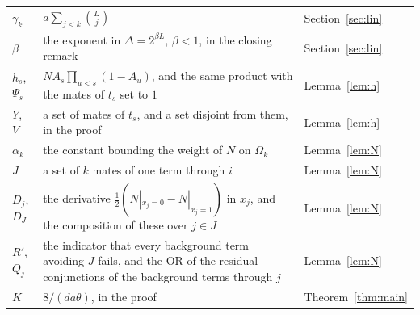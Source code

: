 \documentclass[11pt]{amsart}
\theoremstyle{remark}
\begin{document}
\begin{longtable}{@{}>{\raggedright\arraybackslash}p{}>{\raggedright\arraybackslash}p{}>{\raggedright\arraybackslash}p{}@{}}
$\gamma_k$ & $a\sum_{j<k}\binom Lj$ & Section~\ref{sec:lin} \\
$\beta$ & the exponent in $\Delta=2^{\beta L}$, $\beta<1$, in the closing remark & Section~\ref{sec:lin} \\
$h_s$, $\Psi_s$ & $NA_s\prod_{u<s}(1-A_u)$, and the same product with the mates of $t_s$ set to $1$ & Lemma~\ref{lem:h} \\
$Y$, $V$ & a set of mates of $t_s$, and a set disjoint from them, in the proof & Lemma~\ref{lem:h} \\
$\alpha_k$ & the constant bounding the weight of $N$ on $\Omega_k$ & Lemma~\ref{lem:N} \\
$J$ & a set of $k$ mates of one term through $i$ & Lemma~\ref{lem:N} \\
$D_j$, $D_J$ & the derivative $\frac12(N|_{x_j=0}-N|_{x_j=1})$ in $x_j$, and the composition of these over $j\in J$ & Lemma~\ref{lem:N} \\
$R'$, $Q_j$ & the indicator that every background term avoiding $J$ fails, and the OR of the residual conjunctions of the background terms through $j$ & Lemma~\ref{lem:N} \\
$K$ & $8/(da\theta)$, in the proof & Theorem~\ref{thm:main} \\
\bottomrule
\end{longtable}
\end{document}
